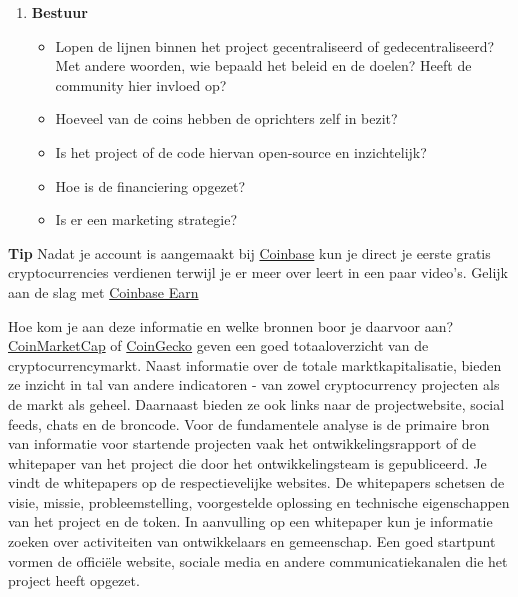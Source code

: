 \begin{enumerate}
\begin{itemize}
    \end{itemize}
    \item \textbf{Bestuur}
    \begin{itemize}
        \item Lopen de lijnen binnen het project gecentraliseerd of gedecentraliseerd? Met andere woorden, wie bepaald het beleid en de doelen? Heeft de community hier invloed op?
         \item Hoeveel van de coins hebben de oprichters zelf in bezit?
        \item Is het project of de code hiervan open-source en inzichtelijk?
        \item Hoe is de financiering opgezet?
          \item Is er een marketing strategie?
        \end{itemize}
\end{enumerate}

    \medskip
    \begin{tipbox}{\textbf{Tip}}
    Nadat je account is aangemaakt bij \href{https://www.coinbase.com/join/51954a2b26a1bcc484000015}{Coinbase} kun je direct je eerste gratis cryptocurrencies verdienen terwijl je er meer over leert in een paar video's.
    \tcblower 
 Gelijk aan de slag met \href{https://www.coinbase.com/earn}{Coinbase Earn}
    \end{tipbox}
    \medskip

Hoe kom je aan deze informatie en welke bronnen boor je daarvoor aan? \href{https://www.coinmarketcap.com/}{CoinMarketCap} of \href{https://www.coingecko.com}{CoinGecko} geven een goed totaaloverzicht van de cryptocurrencymarkt. Naast informatie over de totale marktkapitalisatie, bieden ze inzicht in tal van andere indicatoren - van zowel cryptocurrency projecten als de markt als geheel.
Daarnaast bieden ze ook links naar de projectwebsite, social feeds, chats en de broncode. Voor de fundamentele analyse is de primaire bron van informatie voor startende projecten vaak het ontwikkelingsrapport of de whitepaper van het project die door het ontwikkelingsteam is gepubliceerd. Je vindt de whitepapers op de respectievelijke websites. De whitepapers schetsen de visie, missie, probleemstelling, voorgestelde oplossing en technische eigenschappen van het project en de token. In aanvulling op een whitepaper kun je informatie zoeken over activiteiten van ontwikkelaars en gemeenschap. Een goed startpunt vormen de offici{\"e}le website, sociale media en andere communicatiekanalen die het project heeft opgezet.\medskip

